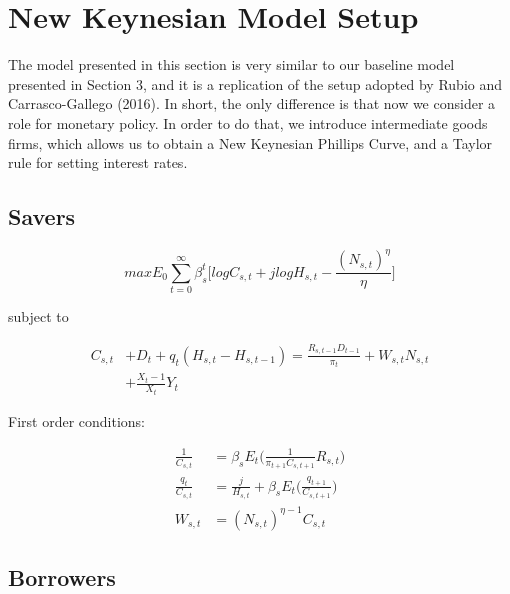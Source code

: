 \documentclass[final,3p,times,twocolumn]{elsarticle}
\begin{document}
\section{New Keynesian Model Setup}

The model presented in this section is very similar to our baseline model presented in Section 3, and it is a replication of the setup adopted by Rubio and Carrasco-Gallego (2016). In short, the only difference is that now we consider a role for monetary policy. In order to do that, we introduce intermediate goods firms, which allows us to obtain a New Keynesian Phillips Curve, and a Taylor rule for setting interest rates.





 \subsection{Savers}

$$max \displaystyle E_0 \sum_{t=0}^{\infty}\beta_s^t \Bigg[ log C_{s,t} + j log H_{s,t} - \frac{(N_{s,t})^\eta}{\eta} \Bigg] $$

subject to 

\begin{align}
C_{s,t}& + D_t + q_t(H_{s,t} - H_{s,t-1}) = \frac{R_{s, t-1}D_{t-1}}{\pi_t}  + W_{s,t}N_{s,t} \nonumber \\
&+ \frac{X_t-1}{X_t}Y_t
\end{align}

First order conditions:

\begin{align}
  \frac{1}{C_{s,t}}  &= \beta_s E_t\Bigg( \frac{1}{\pi_{t+1}C_{s,t+1}}R_{s,t} \Bigg) \\
  \frac{q_t}{C_{s,t}}  &= \frac{j}{H_{s,t}} + \beta_s E_t \Bigg( \frac{q_{t+1}}{C_{s,t+1}} \Bigg)  \\
   W_{s,t}  &= (N_{s,t})^{\eta-1} C_{s,t} 
\end{align}

 \subsection{Borrowers}
\end{document}
